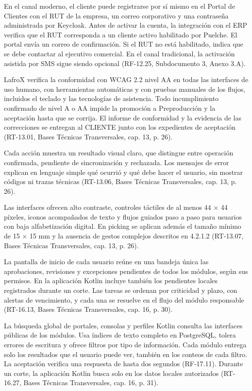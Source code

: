 En el canal moderno, el cliente puede registrarse por sí mismo en el Portal de Clientes con el RUT de la empresa, un correo corporativo y una contraseña administrada por Keycloak. Antes de activar la cuenta, la integración con el ERP verifica que el RUT corresponda a un cliente activo habilitado por Puelche. El portal envía un correo de confirmación. Si el RUT no está habilitado, indica que se debe contactar al ejecutivo comercial. En el canal tradicional, la activación asistida por SMS sigue siendo opcional (RF-12.25, Subdocumento 3, Anexo 3.A).

LafroX verifica la conformidad con WCAG 2.2 nivel AA en todas las interfaces de uso humano, con herramientas automáticas y con pruebas manuales de los flujos, incluidos el teclado y las tecnologías de asistencia. Todo incumplimiento confirmado de nivel A o AA impide la promoción a Preproducción y la aceptación hasta que se corrija. El informe de conformidad y la evidencia de las correcciones se entregan al CLIENTE junto con los expedientes de aceptación (RT-13.01, Bases Técnicas Transversales, cap. 13, p. 26).

Cada acción muestra un resultado visual claro, que distingue entre operación confirmada, pendiente de sincronización y rechazada. Los mensajes de error explican en lenguaje simple qué ocurrió y qué debe hacer el usuario, sin mostrar códigos ni trazas técnicas (RT-13.06, Bases Técnicas Transversales, cap. 13, p. 26).

Las interfaces ofrecen alto contraste, controles táctiles de al menos 44 × 44 píxeles, iconos acompañados de texto y flujos guiados paso a paso para usuarios con baja alfabetización digital. En picking se aplican además el tamaño mínimo de 15 × 15 mm y la ausencia de gestos complejos descritos en 4.2.1.2 (RT-13.07, Bases Técnicas Transversales, cap. 13, p. 26).

La pantalla de inicio de cada usuario reúne en una bandeja única las aprobaciones, revisiones y excepciones pendientes de todos los módulos, según sus permisos. En la aplicación Kotlin incluye también los pendientes locales registrados durante un corte. Las tareas se ordenan por criticidad y plazo, con alertas de vencimiento, y cada una se resuelve en el flujo del módulo responsable (RT-16.13, Bases Técnicas Transversales, cap. 16, p. 30).

La búsqueda global de portales, consolas y perfiles Kotlin consulta las interfaces públicas de los módulos. Usa índices de texto completo en PostgreSQL, tolera errores de escritura y ofrece filtros por tipo de información. Cada módulo entrega solo los resultados que el usuario puede ver, también en los conteos de cada filtro. La aceptación verifica una respuesta de hasta dos segundos (RF-17.11). Durante un corte, la aplicación Kotlin busca solo en los datos locales autorizados (RT-16.27, Bases Técnicas Transversales, cap. 16, p. 31).

